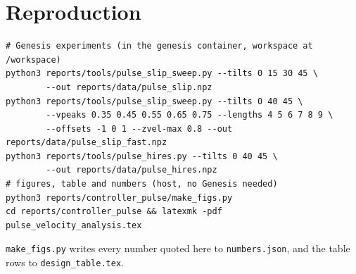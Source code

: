 \documentclass[10.5pt,a4paper]{article}
\newcommand{\code}[1]{\texttt{#1}}
\begin{document}
\section{Reproduction}
\begin{verbatim}
# Genesis experiments (in the genesis container, workspace at /workspace)
python3 reports/tools/pulse_slip_sweep.py --tilts 0 15 30 45 \
        --out reports/data/pulse_slip.npz
python3 reports/tools/pulse_slip_sweep.py --tilts 0 40 45 \
        --vpeaks 0.35 0.45 0.55 0.65 0.75 --lengths 4 5 6 7 8 9 \
        --offsets -1 0 1 --zvel-max 0.8 --out reports/data/pulse_slip_fast.npz
python3 reports/tools/pulse_hires.py --tilts 0 40 45 \
        --out reports/data/pulse_hires.npz
# figures, table and numbers (host, no Genesis needed)
python3 reports/controller_pulse/make_figs.py
cd reports/controller_pulse && latexmk -pdf pulse_velocity_analysis.tex
\end{verbatim}
\code{make\_figs.py} writes every number quoted here to \code{numbers.json}, and the table rows to
\code{design\_table.tex}.
\end{document}

